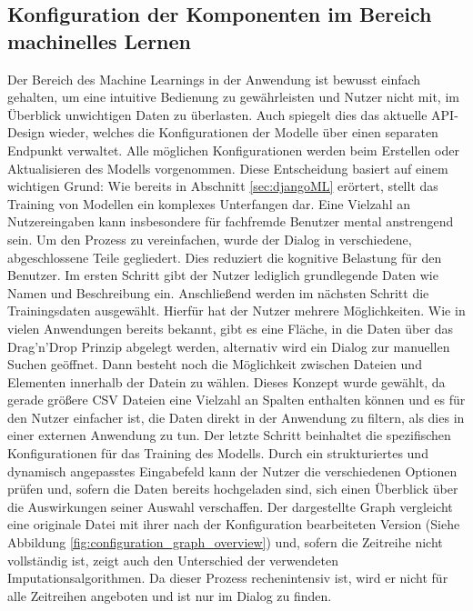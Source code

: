 \subsection{Konfiguration der Komponenten im Bereich machinelles Lernen}
Der Bereich des Machine Learnings in der Anwendung ist bewusst einfach gehalten, um eine intuitive Bedienung zu gewährleisten und Nutzer nicht mit, im Überblick unwichtigen Daten zu überlasten. Auch spiegelt dies das aktuelle \ac{API}-Design wieder, welches die Konfigurationen der Modelle über einen separaten Endpunkt verwaltet. 
Alle möglichen Konfigurationen werden beim Erstellen oder Aktualisieren des Modells vorgenommen. Diese Entscheidung basiert auf einem wichtigen Grund: 
Wie bereits in Abschnitt \ref{sec:djangoML} erörtert, stellt das Training von Modellen ein komplexes Unterfangen dar. Eine Vielzahl an Nutzereingaben kann insbesondere für fachfremde Benutzer mental anstrengend sein. 
Um den Prozess zu vereinfachen, wurde der Dialog in verschiedene, abgeschlossene Teile gegliedert. Dies reduziert die kognitive Belastung für den Benutzer. 
Im ersten Schritt gibt der Nutzer lediglich grundlegende Daten wie Namen und Beschreibung ein. Anschließend werden im nächsten Schritt die Trainingsdaten ausgewählt. Hierfür hat der Nutzer mehrere Möglichkeiten.
Wie in vielen Anwendungen bereits bekannt, gibt es eine Fläche, in die Daten über das Drag'n'Drop Prinzip abgelegt werden, alternativ wird ein Dialog zur manuellen Suchen geöffnet. 
Dann besteht noch die Möglichkeit zwischen Dateien und Elementen innerhalb der Datein zu wählen. Dieses Konzept wurde gewählt, da gerade größere CSV Dateien eine Vielzahl an Spalten enthalten können und es für den Nutzer einfacher ist, die Daten direkt in der Anwendung zu filtern, als dies in einer externen Anwendung zu tun.
Der letzte Schritt beinhaltet die spezifischen Konfigurationen für das Training des Modells. Durch ein strukturiertes und dynamisch angepasstes Eingabefeld kann der Nutzer die verschiedenen Optionen prüfen und, sofern die Daten bereits hochgeladen sind, sich einen Überblick über die Auswirkungen seiner Auswahl verschaffen. 
Der dargestellte Graph vergleicht eine originale Datei mit ihrer nach der Konfiguration bearbeiteten Version (Siehe Abbildung \ref{fig:configuration_graph_overview}) und, sofern die Zeitreihe nicht vollständig ist, zeigt auch den Unterschied der verwendeten Imputationsalgorithmen. Da dieser Prozess rechenintensiv ist, wird er nicht für alle Zeitreihen angeboten und ist nur im Dialog zu finden.

